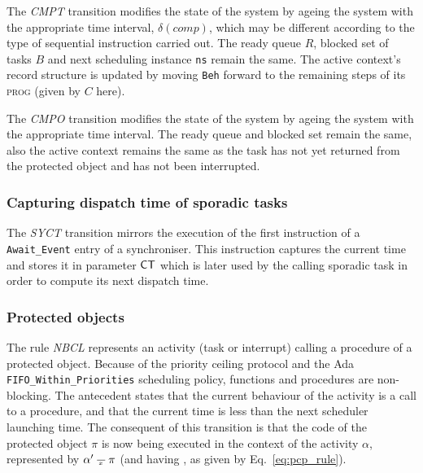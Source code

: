 The \emph{CMPT} transition modifies the state of the system by ageing
the system with the appropriate time interval, $\delta(comp)$, which
may be different according to the type of sequential instruction
carried out. The ready queue $R$, blocked set of tasks $B$ and next
scheduling instance \texttt{ns} remain the same. The active context's
record structure is updated by moving \texttt{Beh} forward to the
remaining steps of its {\scshape prog} (given by $C$ here).


The \emph{CMPO} transition modifies the state of the system by ageing
the system with the appropriate time interval. The ready queue and
blocked set remain the same, also the active context remains the same
as the task has not yet returned from the protected object and has not
been interrupted.

\subsubsection{Capturing dispatch time of sporadic tasks}
The \emph{SYCT} transition mirrors the execution of the first
instruction of a \texttt{Await\_Event} entry of a synchroniser. This
instruction captures the current time and stores it in parameter
$\text{\sffamily CT}$ which is later used by the calling sporadic task in order
to compute its next dispatch time.


\subsubsection{Protected objects}
The rule \emph{NBCL} represents an activity (task or interrupt)
calling a procedure of a protected object. Because of the priority
ceiling protocol and the Ada \texttt{FIFO\_Within\_Priorities}
scheduling policy, functions and procedures are non-blocking. The
antecedent states that the current behaviour of the activity is a call
to a procedure, and that the current time is less than the next
scheduler launching time. The consequent of this transition is that
the code of the protected object $\pi$ is now being executed in the
context of the activity $\alpha$, represented by $\alpha'\,\frac{}{\,^{{x}}\,}\,\pi$
(and having , as given by
Eq.~\ref{eq:pcp_rule}).

